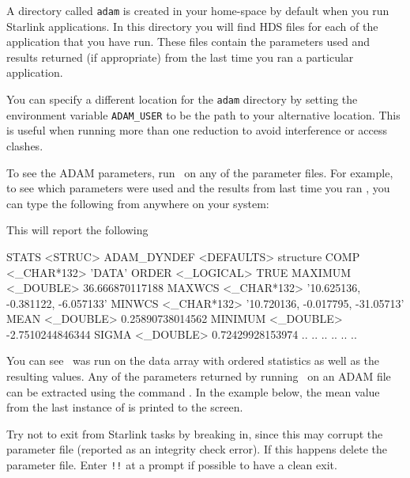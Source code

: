 \documentclass[11pt,oneside,chapters]{starlink}
\begin{document}
A directory called \texttt{adam} is created in your home-space by
default when you run Starlink applications. In this directory you will
find HDS files for each of the application that you have run. These
files contain the parameters used and results returned (if
appropriate) from the last time you ran a particular application.

You can specify a different location for the \texttt{adam} directory
by setting the environment variable \texttt{ADAM\_USER} to be the path
to your alternative location. This is useful when running more than
one reduction to avoid interference or access clashes.

To see the ADAM parameters, run \HDSTRACE\ on any of the parameter
files. For example, to see which parameters were used and the results
from last time you ran \stats, you can type the following from
anywhere on your system:

\begin{terminalv}
\end{terminalv}

This will report the following
\begin{terminalv}
STATS  <STRUC>
   ADAM_DYNDEF    <DEFAULTS>      {structure}
   COMP           <_CHAR*132>     'DATA'
   ORDER          <_LOGICAL>      TRUE
   MAXIMUM        <_DOUBLE>       36.666870117188
   MAXWCS         <_CHAR*132>     '10.625136, -0.381122, -6.057133'
   MINWCS         <_CHAR*132>     '10.720136, -0.017795, -31.05713'
   MEAN           <_DOUBLE>       0.25890738014562
   MINIMUM        <_DOUBLE>       -2.7510244846344
   SIGMA          <_DOUBLE>       0.72429928153974
    ..               ..                 ..
    ..               ..                 ..
\end{terminalv}
\vspace{0.3cm}
You can see \stats\ was run on the data array with ordered statistics
as well as the resulting values. Any of the parameters returned by
running \HDSTRACE\ on an ADAM file can be extracted using the command
. In the example below, the mean value from the last
instance of  is printed to the screen.
\begin{terminalv}
\end{terminalv}

\begin{tip}
Try not to exit from Starlink tasks by breaking in, since this may
corrupt the parameter file (reported as an integrity check error).  If
this happens delete the parameter file.  Enter \texttt{!!} at a prompt
if possible to have a clean exit.
\end{tip}
\end{document}
